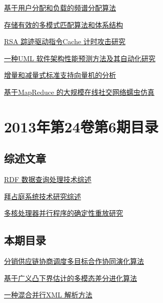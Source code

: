 \documentclass[a4paper]{article}
\begin{document}
\href{http://www.jos.org.cn/ch/reader/download_pdf.aspx?file_no=4312&year_id=2013&quarter_id=7&falg=1}{基于用户分配和负载的频谱分配算法}

\href{http://www.jos.org.cn/ch/reader/download_pdf.aspx?file_no=4314&year_id=2013&quarter_id=7&falg=1}{存储有效的多模式匹配算法和体系结构}

\href{http://www.jos.org.cn/ch/reader/download_pdf.aspx?file_no=4329&year_id=2013&quarter_id=7&falg=1}{RSA 踪迹驱动指令Cache 计时攻击研究}

\href{http://www.jos.org.cn/ch/reader/download_pdf.aspx?file_no=4268&year_id=2013&quarter_id=7&falg=1}{一种UML 软件架构性能预测方法及其自动化研究}

\href{http://www.jos.org.cn/ch/reader/download_pdf.aspx?file_no=4327&year_id=2013&quarter_id=7&falg=1}{增量和减量式标准支持向量机的分析}

\href{http://www.jos.org.cn/ch/reader/download_pdf.aspx?file_no=4295&year_id=2013&quarter_id=7&falg=1}{基于MapReduce 的大规模在线社交网络蠕虫仿真}


\section{\textbf{2013年第24卷第6期目录}}
\subsection{综述文章}
\href{http://www.jos.org.cn/ch/reader/download_pdf.aspx?file_no=4387&year_id=2013&quarter_id=6&falg=1}{RDF 数据查询处理技术综述}

\href{http://www.jos.org.cn/ch/reader/download_pdf.aspx?file_no=4395&year_id=2013&quarter_id=6&falg=1}{拜占庭系统技术研究综述}

\href{http://www.jos.org.cn/ch/reader/download_pdf.aspx?file_no=4392&year_id=2013&quarter_id=6&falg=1}{多核处理器并行程序的确定性重放研究}

\subsection{本期目录}
\href{http://www.jos.org.cn/ch/reader/download_pdf.aspx?file_no=4288&year_id=2013&quarter_id=6&falg=1}{分销供应链协商调度多目标合作协同演化算法}

\href{http://www.jos.org.cn/ch/reader/download_pdf.aspx?file_no=4323&year_id=2013&quarter_id=6&falg=1}{基于广义凸下界估计的多模态差分进化算法}

\href{http://www.jos.org.cn/ch/reader/download_pdf.aspx?file_no=4281&year_id=2013&quarter_id=6&falg=1}{一种混合并行XML 解析方法}
\end{document}
